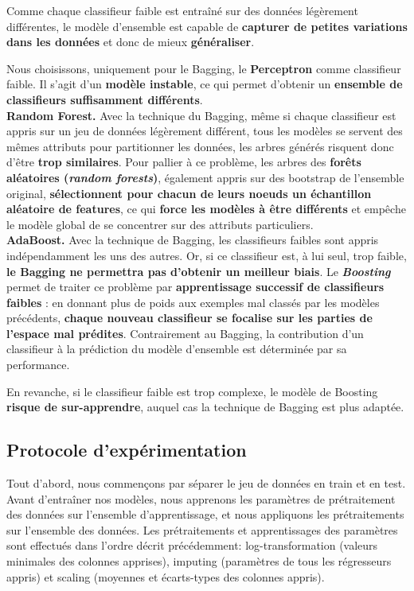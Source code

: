 \documentclass[12pt]{article}
\begin{document}
Comme chaque classifieur faible est entraîné sur des données légèrement
différentes, le modèle d'ensemble est capable de \textbf{capturer de petites
variations dans les données} et donc de mieux \textbf{généraliser}. 

Nous choisissons, uniquement pour le Bagging, le \textbf{Perceptron} comme
classifieur faible. Il s'agit d'un \textbf{modèle instable}, ce qui permet
d'obtenir un \textbf{ensemble de classifieurs suffisamment différents}. \\

\textbf{Random Forest. } \quad Avec la technique du Bagging, même si chaque
classifieur est appris sur un jeu de données légèrement différent, tous les
modèles se servent des mêmes attributs pour partitionner les données, les arbres
générés risquent donc d'être \textbf{trop similaires}. Pour pallier à ce
problème, les arbres des \textbf{forêts aléatoires (\emph{random forests})},
également appris sur des bootstrap de l'ensemble original, \textbf{sélectionnent
pour chacun de leurs noeuds un échantillon aléatoire de features}, ce qui
\textbf{force les modèles à être différents} et empêche le modèle global de se
concentrer sur des attributs particuliers. \\

\textbf{AdaBoost. } \quad Avec la technique de Bagging, les classifieurs faibles
sont appris indépendamment les uns des autres. Or, si ce classifieur est, à lui
seul, trop faible, \textbf{le Bagging ne permettra pas d'obtenir un meilleur
biais}. Le \textbf{\emph{Boosting}} permet de traiter ce problème par
\textbf{apprentissage successif de classifieurs faibles} : en donnant plus de
poids aux exemples mal classés par les modèles précédents, \textbf{chaque
nouveau classifieur se focalise sur les parties de l'espace mal prédites}.
Contrairement au Bagging, la contribution d'un classifieur à la prédiction du
modèle d'ensemble est déterminée par sa performance.

En revanche, si le classifieur faible est trop complexe, le modèle de Boosting
\textbf{risque de sur-apprendre}, auquel cas la technique de Bagging est plus
adaptée.\\

\subsection{Protocole d'expérimentation}
Tout d'abord, nous commençons par séparer le jeu de données en train et en test.
Avant d'entraîner nos modèles, nous apprenons les paramètres de prétraitement
des données sur l'ensemble d'apprentissage, et nous appliquons les prétraitements
sur l'ensemble des données. Les prétraitements et apprentissages des paramètres
sont effectués dans l'ordre décrit précédemment:
log-transformation (valeurs minimales des colonnes apprises),
imputing (paramètres de tous les régresseurs appris)
et scaling (moyennes et écarts-types des colonnes appris). \\
\end{document}
